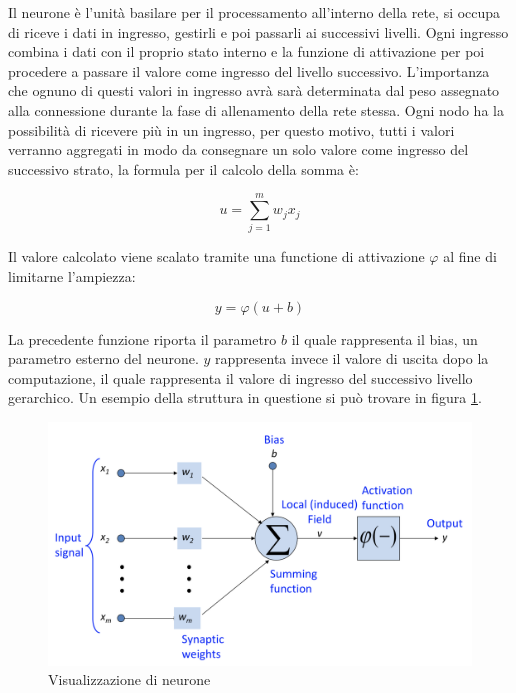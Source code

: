 \documentclass[%
    corpo=12pt,
    twoside,
    oldstyle,
    autoretitolo,
    greek,
    evenboxes,
]{toptesi}
\begin{document}
Il neurone è l'unità basilare per il processamento all'interno della rete, si occupa di riceve i dati in ingresso, gestirli e poi passarli ai successivi livelli. Ogni ingresso combina i dati con il proprio stato interno e la funzione di attivazione per poi procedere a passare il valore come ingresso del livello successivo. L'importanza che ognuno di questi valori in ingresso avrà sarà determinata dal peso assegnato alla connessione durante la fase di allenamento della rete stessa. Ogni nodo ha la possibilità di ricevere più in un ingresso, per questo motivo, tutti i valori verranno aggregati in modo da consegnare un solo valore come ingresso del successivo strato, la formula per il calcolo della somma è:
\begin{center}
  \begin{equation}
    u = \sum^{m}_{j=1} w_{j}x_{j}
  \end{equation}
\end{center}
Il valore calcolato viene scalato tramite una functione di attivazione $\varphi$ al fine di limitarne l'ampiezza:
\begin{center}
  \begin{equation}
    y = \varphi(u + b)
  \end{equation}
\end{center}
La precedente funzione riporta il parametro $b$ il quale rappresenta il bias, un parametro esterno del neurone. $y$ rappresenta invece il valore di uscita dopo la computazione, il quale rappresenta il valore di ingresso del successivo livello gerarchico. Un esempio della struttura in questione si può trovare in figura \ref{fig:neuron}.
\begin{figure}[!ht]
  \includegraphics[width=\linewidth]{figure/neuron.png}
  \caption{Visualizzazione di neurone}
  \label{fig:neuron}
\end{figure}
\end{document}
